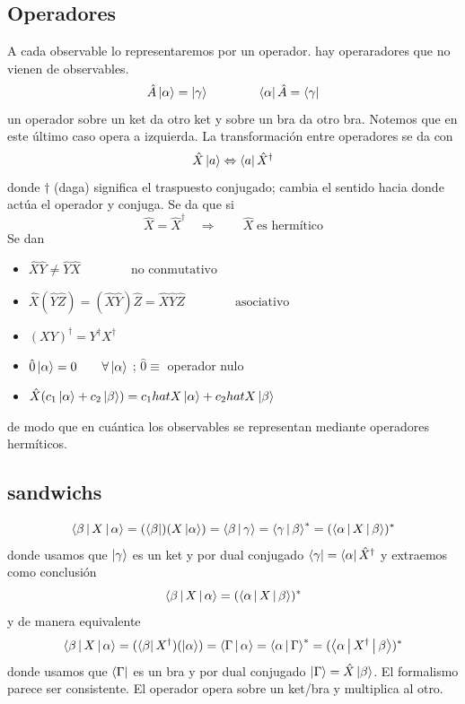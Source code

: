 \documentclass[10pt,oneside]{CBFT_book}
\begin{document}
\subsection{Operadores}

A cada observable lo representaremos por un operador. hay operaradores que no vienen de observables.
\[
	\hat{A}\Ket{\alpha} = \Ket{\gamma} \qquad \qquad  \Bra{\alpha} \hat{A} = \Bra{\gamma}
\]
un operador sobre un ket da otro ket y sobre un bra da otro bra. Notemos que en este último caso opera 
a izquierda. La transformación entre operadores se da con 
\[
	\hat{X}\Ket{a} \Leftrightarrow \Bra{a}\hat{X}^\dagger
\]
donde $\dagger$ (daga) significa el traspuesto conjugado; cambia el sentido hacia donde actúa el operador 
y conjuga. Se da que si 
\[
	\hat{X} = \hat{X}^\dagger \quad \Rightarrow \qquad \hat{X} \;\text{es hermítico}
\]
Se dan 
\begin{itemize}
 \item $\hat{X}\hat{Y} \neq \hat{Y}\hat{X} \qquad \qquad \text{no conmutativo}$
 \item $\hat{X}(\hat{Y}\hat{Z}) = (\hat{X}\hat{Y})\hat{Z} = \hat{X}\hat{Y}\hat{Z} \qquad \qquad \text{asociativo}$
 \item $(XY)^\dagger = Y^\dagger X^\dagger$
 \item $\hat{0}\Ket{\alpha} = 0 \qquad \forall \Ket{\alpha}$ ; $\hat{0} \equiv$ operador nulo
 \item $\hat{X}( c_1 \Ket{\alpha} + c_2 \Ket{\beta} ) = c_1 hat{X}\Ket{\alpha} + c_2 hat{X}\Ket{\beta} $
\end{itemize}

de modo que en cuántica los observables se representan mediante operadores hermíticos.

\subsection{sandwichs}

\[
	\Braket{\beta|X|\alpha} = (\Bra{\beta})(X\Ket{\alpha}) = \Braket{\beta|\gamma} =
	\Braket{\gamma|\beta}^* = (\Braket{\alpha|X|\beta})^*
\]
donde usamos que $\Ket{\gamma}$ es un ket y por dual conjugado $\Bra{\gamma} = \Bra{\alpha}\hat{X}^\dagger$ y
extraemos como conclusión 
\[
	\Braket{\beta|X|\alpha} = (\Braket{\alpha|X|\beta})^*
\]
y de manera equivalente
\[
	\Braket{\beta|X|\alpha} = (\Bra{\beta}X^\dagger)(\Ket{\alpha}) = \Braket{\Gamma|\alpha} =
	\Braket{\alpha|\Gamma}^* = (\Braket{\alpha|X^\dagger|\beta})^*
\]
donde usamos que $\Bra{\Gamma}$ es un bra y por dual conjugado $\Ket{\Gamma} = \hat{X}\Ket{\beta}$.
El formalismo parece ser consistente. El operador opera sobre un ket/bra y multiplica al otro.
\end{document}
